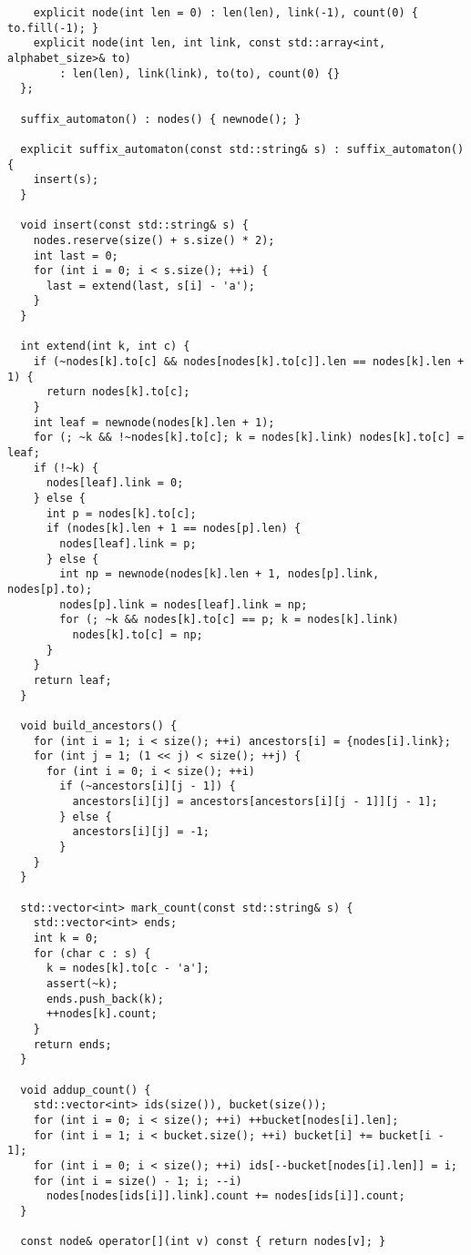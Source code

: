 \documentclass[6pt]{article}
\begin{document}
\begin{multicols}{2}
\begin{lstlisting}
    explicit node(int len = 0) : len(len), link(-1), count(0) { to.fill(-1); }
    explicit node(int len, int link, const std::array<int, alphabet_size>& to)
        : len(len), link(link), to(to), count(0) {}
  };

  suffix_automaton() : nodes() { newnode(); }

  explicit suffix_automaton(const std::string& s) : suffix_automaton() {
    insert(s);
  }

  void insert(const std::string& s) {
    nodes.reserve(size() + s.size() * 2);
    int last = 0;
    for (int i = 0; i < s.size(); ++i) {
      last = extend(last, s[i] - 'a');
    }
  }

  int extend(int k, int c) {
    if (~nodes[k].to[c] && nodes[nodes[k].to[c]].len == nodes[k].len + 1) {
      return nodes[k].to[c];
    }
    int leaf = newnode(nodes[k].len + 1);
    for (; ~k && !~nodes[k].to[c]; k = nodes[k].link) nodes[k].to[c] = leaf;
    if (!~k) {
      nodes[leaf].link = 0;
    } else {
      int p = nodes[k].to[c];
      if (nodes[k].len + 1 == nodes[p].len) {
        nodes[leaf].link = p;
      } else {
        int np = newnode(nodes[k].len + 1, nodes[p].link, nodes[p].to);
        nodes[p].link = nodes[leaf].link = np;
        for (; ~k && nodes[k].to[c] == p; k = nodes[k].link)
          nodes[k].to[c] = np;
      }
    }
    return leaf;
  }

  void build_ancestors() {
    for (int i = 1; i < size(); ++i) ancestors[i] = {nodes[i].link};
    for (int j = 1; (1 << j) < size(); ++j) {
      for (int i = 0; i < size(); ++i)
        if (~ancestors[i][j - 1]) {
          ancestors[i][j] = ancestors[ancestors[i][j - 1]][j - 1];
        } else {
          ancestors[i][j] = -1;
        }
    }
  }

  std::vector<int> mark_count(const std::string& s) {
    std::vector<int> ends;
    int k = 0;
    for (char c : s) {
      k = nodes[k].to[c - 'a'];
      assert(~k);
      ends.push_back(k);
      ++nodes[k].count;
    }
    return ends;
  }

  void addup_count() {
    std::vector<int> ids(size()), bucket(size());
    for (int i = 0; i < size(); ++i) ++bucket[nodes[i].len];
    for (int i = 1; i < bucket.size(); ++i) bucket[i] += bucket[i - 1];
    for (int i = 0; i < size(); ++i) ids[--bucket[nodes[i].len]] = i;
    for (int i = size() - 1; i; --i)
      nodes[nodes[ids[i]].link].count += nodes[ids[i]].count;
  }

  const node& operator[](int v) const { return nodes[v]; }


\end{lstlisting}
\end{multicols}
\end{document}
